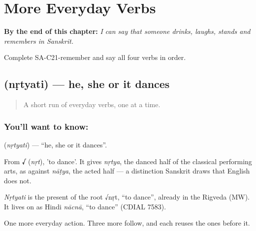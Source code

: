 
\chapter{More Everyday Verbs}
\label{ch:sa-more-verbs}

\begin{chapteropening}
\textbf{By the end of this chapter:} \emph{I can say that someone drinks, laughs, stands and remembers in Sanskrit.}

Complete SA-C21-remember and say all four verbs in order.
\end{chapteropening}

\section[\texorpdfstring{\sk{नृत्यति} (nṛtyati)}{नृत्यति (nṛtyati)}]{ (nṛtyati) — he, she or it dances}

\label{lesson:SA-C21-dance}



\begin{quote}
A short run of everyday verbs, one at a time.
\end{quote}

\subsection*{You'll want to know: }
\textbf{} (\emph{nṛtyati}) — \textquotedblleft{}he, she or it dances\textquotedblright{}.

From \textbf{√} (\emph{nṛt}), 'to dance'. It gives \emph{nṛtya}, the danced half of the classical performing arts, as against \emph{nāṭya}, the acted half — a distinction Sanskrit draws that English does not.

\begin{cousinweb}
\emph{Nṛtyati} is the present of the root √nṛt, \textquotedblleft{}to dance\textquotedblright{}, already in the Rigveda (MW). It lives on as Hindi \emph{nācnā}, \textquotedblleft{}to dance\textquotedblright{} (CDIAL 7583).
\end{cousinweb}

\begin{grammarlens}[title={What you've built}]
One more everyday action. Three more follow, and each reuses the ones before it.
\end{grammarlens}

